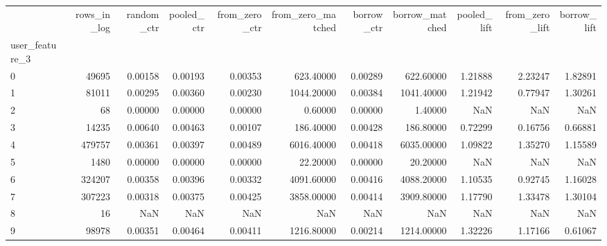 \begin{tabular}{lrrrrrrrrrr}
\toprule
 & rows\_in\_log & random\_ctr & pooled\_ctr & from\_zero\_ctr & from\_zero\_matched & borrow\_ctr & borrow\_matched & pooled\_lift & from\_zero\_lift & borrow\_lift \\
user\_feature\_3 &  &  &  &  &  &  &  &  &  &  \\
\midrule
0 & 49695 & 0.00158 & 0.00193 & 0.00353 & 623.40000 & 0.00289 & 622.60000 & 1.21888 & 2.23247 & 1.82891 \\
1 & 81011 & 0.00295 & 0.00360 & 0.00230 & 1044.20000 & 0.00384 & 1041.40000 & 1.21942 & 0.77947 & 1.30261 \\
2 & 68 & 0.00000 & 0.00000 & 0.00000 & 0.60000 & 0.00000 & 1.40000 & NaN & NaN & NaN \\
3 & 14235 & 0.00640 & 0.00463 & 0.00107 & 186.40000 & 0.00428 & 186.80000 & 0.72299 & 0.16756 & 0.66881 \\
4 & 479757 & 0.00361 & 0.00397 & 0.00489 & 6016.40000 & 0.00418 & 6035.00000 & 1.09822 & 1.35270 & 1.15589 \\
5 & 1480 & 0.00000 & 0.00000 & 0.00000 & 22.20000 & 0.00000 & 20.20000 & NaN & NaN & NaN \\
6 & 324207 & 0.00358 & 0.00396 & 0.00332 & 4091.60000 & 0.00416 & 4088.20000 & 1.10535 & 0.92745 & 1.16028 \\
7 & 307223 & 0.00318 & 0.00375 & 0.00425 & 3858.00000 & 0.00414 & 3909.80000 & 1.17790 & 1.33478 & 1.30104 \\
8 & 16 & NaN & NaN & NaN & NaN & NaN & NaN & NaN & NaN & NaN \\
9 & 98978 & 0.00351 & 0.00464 & 0.00411 & 1216.80000 & 0.00214 & 1214.00000 & 1.32226 & 1.17166 & 0.61067 \\
\bottomrule
\end{tabular}
